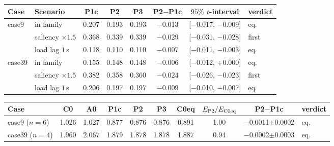 \begin{tabular}{llcccccl}
\toprule
Case & Scenario & P1c & P2 & P3 & P2$-$P1c & $95\%$ $t$-interval & verdict\\
\midrule
case9 & in family & 0.207 & 0.193 & 0.193 & $-$0.013 & [$-$0.017, $-$0.009] & eq.\\
 & saliency $\times1.5$ & 0.368 & 0.339 & 0.339 & $-$0.029 & [$-$0.031, $-$0.028] & first\\
 & load lag $1$\,s & 0.118 & 0.110 & 0.110 & $-$0.007 & [$-$0.011, $-$0.003] & eq.\\
\midrule
case39 & in family & 0.155 & 0.148 & 0.148 & $-$0.006 & [$-$0.012, +0.000] & eq.\\
 & saliency $\times1.5$ & 0.382 & 0.358 & 0.360 & $-$0.024 & [$-$0.026, $-$0.023] & first\\
 & load lag $1$\,s & 0.206 & 0.197 & 0.197 & $-$0.009 & [$-$0.010, $-$0.007] & eq.\\
\bottomrule
\end{tabular}
\begin{tabular}{lccccccccl}
\toprule
Case & C0 & A0 & P1c & P2 & P3 & C0eq & $E_{\rm P2}/E_{\rm C0eq}$ & P2$-$P1c & verdict\\
\midrule
case9 ($n=6$) & 1.026 & 1.027 & 0.877 & 0.876 & 0.876 & 0.891 & 1.00 & $-$0.0011$\pm$0.0002 & eq.\\
case39 ($n=4$) & 1.960 & 2.067 & 1.879 & 1.878 & 1.878 & 1.887 & 0.94 & $-$0.0002$\pm$0.0003 & eq.\\
\bottomrule
\end{tabular}

